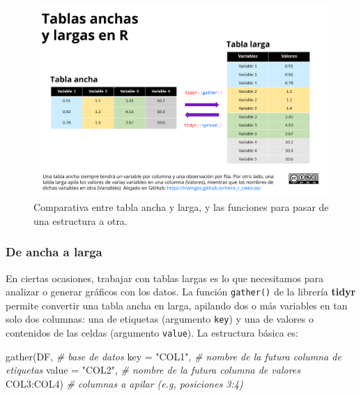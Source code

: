 \documentclass[
]{article}
\newenvironment{Shaded}{\begin{snugshade}}{\end{snugshade}}
\newcommand{\AttributeTok}[1]{\textcolor[rgb]{0.77,0.63,0.00}{#1}}
\newcommand{\CommentTok}[1]{\textcolor[rgb]{0.56,0.35,0.01}{\textit{#1}}}
\newcommand{\FunctionTok}[1]{\textcolor[rgb]{0.00,0.00,0.00}{#1}}
\newcommand{\NormalTok}[1]{#1}
\newcommand{\SpecialCharTok}[1]{\textcolor[rgb]{0.00,0.00,0.00}{#1}}
\newcommand{\StringTok}[1]{\textcolor[rgb]{0.31,0.60,0.02}{#1}}
\theoremstyle{definition}
\theoremstyle{definition}
\theoremstyle{definition}
\theoremstyle{definition}
\theoremstyle{remark}
\begin{document}
\begin{figure}

{\centering \includegraphics[width=1\linewidth]{figs/elaboradas/tablas ancha y larga} 

}

\caption{Comparativa entre tabla ancha y larga, y las funciones para pasar de una estructura a otra.}\label{fig:figura59}
\end{figure}

\hypertarget{de-ancha-a-larga}{%
\subsubsection{De ancha a larga}\label{de-ancha-a-larga}}

En ciertas ocasiones, trabajar con tablas largas es lo que necesitamos para analizar o generar gráficos con los datos. La función \texttt{gather()} de la librería \textbf{tidyr} permite convertir una tabla ancha en larga, apilando dos o más variables en tan solo dos columnas: una de etiquetas (argumento \texttt{key}) y una de valores o contenidos de las celdas (argumento \texttt{value}). La estructura básica es:

\begin{Shaded}
\begin{Highlighting}[]
\FunctionTok{gather}\NormalTok{(DF,             }\CommentTok{\# base de datos}
       \AttributeTok{key =} \StringTok{"COL1"}\NormalTok{,   }\CommentTok{\# nombre de la futura columna de etiquetas}
       \AttributeTok{value =} \StringTok{"COL2"}\NormalTok{, }\CommentTok{\# nombre de la futura columna de valores}
\NormalTok{       COL3}\SpecialCharTok{:}\NormalTok{COL4)      }\CommentTok{\# columnas a apilar (e.g, posiciones 3:4)}
\end{Highlighting}
\end{Shaded}
\end{document}
